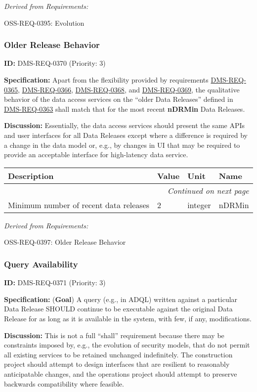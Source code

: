 \documentclass[SE,toc,lsstdraft]{lsstdoc}
\makeatletter
\newcommand{\paramname}[1]{\hspace{0pt}#1}
\newcommand{\unitname}[1]{\hspace{0pt}#1}
\newenvironment{parameters}[0]{%
\setlength\LTleft{0pt}
\setlength\LTright{\fill}
\begin{small}
\begin{longtable}[]{|p{0.49\textwidth}|l|p{0.6in}|p{1.70in}@{}|}

\hline \textbf{Description} & \textbf{Value} & \textbf{Unit} & \textbf{Name} \\ \hline
\endhead

\hline \multicolumn{4}{r}{\emph{Continued on next page}} \\
\endfoot

\hline\hline
\endlastfoot
}{%
\hline
\end{longtable}
\end{small}
}
\makeatother
\begin{document}
\emph{Derived from Requirements:}

OSS-REQ-0395:
Evolution \newline

\subsubsection{Older Release Behavior}

\label{DMS-REQ-0370}
\textbf{ID:} DMS-REQ-0370 (Priority: 3)

\textbf{Specification:}
Apart from the flexibility provided by requirements \hyperref[DMS-REQ-0365]{DMS-REQ-0365}, \hyperref[DMS-REQ-0366]{DMS-REQ-0366}, \hyperref[DMS-REQ-0368]{DMS-REQ-0368}, and \hyperref[DMS-REQ-0369]{DMS-REQ-0369}, the qualitative behavior of the data access services on the “older Data Releases” defined in \hyperref[DMS-REQ-0363]{DMS-REQ-0363} shall match that for the most recent \textbf{nDRMin} Data Releases.

\textbf{Discussion:}
Essentially, the data access services should present the same APIs and user interfaces for all Data Releases except where a difference is required by a change in the data model or, e.g., by changes in UI that may be required to provide an acceptable interface for high-latency data service.

\begin{parameters}
Minimum number of recent data releases
&
2
&
\unitname{%
integer
}
&
\paramname{%
nDRMin
} \\\hline
\end{parameters}

\emph{Derived from Requirements:}

OSS-REQ-0397:
Older Release Behavior \newline

\subsubsection{Query Availability}

\label{DMS-REQ-0371}
\textbf{ID:} DMS-REQ-0371 (Priority: 3)

\textbf{Specification:}
(\textbf{Goal}) A query (e.g., in ADQL) written against a particular Data Release SHOULD continue to be executable against the original Data Release for as long as it is available in the system, with few, if any, modifications.

\textbf{Discussion:}
This is not a full “shall” requirement because there may be constraints imposed by, e.g., the evolution of security models, that do not permit all existing services to be retained unchanged indefinitely. The construction project should attempt to design interfaces that are resilient to reasonably anticipatable changes, and the operations project should attempt to preserve backwards compatibility where feasible.
\end{document}
